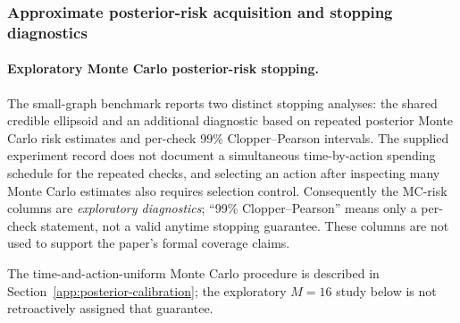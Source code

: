 \documentclass{article}
\theoremstyle{plain}
\theoremstyle{definition}
\begin{document}
\subsubsection{Approximate posterior-risk acquisition and stopping diagnostics}

\paragraph{Exploratory Monte Carlo posterior-risk stopping.}
The small-graph benchmark reports two distinct stopping analyses: the shared credible ellipsoid and an additional diagnostic based on repeated posterior Monte Carlo risk estimates and per-check 99\% Clopper--Pearson intervals. The supplied experiment record does not document a simultaneous time-by-action spending schedule for the repeated checks, and selecting an action after inspecting many Monte Carlo estimates also requires selection control. Consequently the MC-risk columns are \emph{exploratory diagnostics}; ``99\% Clopper--Pearson'' means only a per-check statement, not a valid anytime stopping guarantee. These columns are not used to support the paper's formal coverage claims.

The time-and-action-uniform Monte Carlo procedure is described in Section~\ref{app:posterior-calibration}; the exploratory $M=16$ study below is not retroactively assigned that guarantee.
\end{document}
